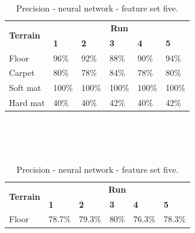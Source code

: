 \documentclass[USenglish]{ifimaster}  %
\begin{document}
\begin{table}[h]
	\begin{subtable}[h]{1\textwidth}
		\centering
		\captionsetup{justification=centering}
		\begin{tabular}{@{}llllll@{}}
			\toprule
			\multirow{2}{*}{\textbf{Terrain}} & \multicolumn{5}{c}{\textbf{Run}} \\ \cmidrule(l){2-6} 
			& \multicolumn{1}{l|}{\textbf{1}} & \multicolumn{1}{l|}{\textbf{2}} & \multicolumn{1}{l|}{\textbf{3}} & \multicolumn{1}{l|}{\textbf{4}} & \textbf{5} \\ \midrule
			\multicolumn{1}{l|}{Floor} & \multicolumn{1}{l|}{96\%} & \multicolumn{1}{l|}{92\%} & \multicolumn{1}{l|}{88\%} & \multicolumn{1}{l|}{90\%} & 94\% \\ \midrule
			\multicolumn{1}{l|}{Carpet} & \multicolumn{1}{l|}{80\%} & \multicolumn{1}{l|}{78\%} & \multicolumn{1}{l|}{84\%} & \multicolumn{1}{l|}{78\%} & 80\% \\ \midrule
			\multicolumn{1}{l|}{Soft mat} & \multicolumn{1}{l|}{100\%} & \multicolumn{1}{l|}{100\%} & \multicolumn{1}{l|}{100\%} & \multicolumn{1}{l|}{100\%} & 100\% \\ \midrule
			\multicolumn{1}{l|}{Hard mat} & \multicolumn{1}{l|}{40\%} & \multicolumn{1}{l|}{40\%} & \multicolumn{1}{l|}{42\%} & \multicolumn{1}{l|}{40\%} & 42\% \\ \bottomrule
		\end{tabular}
		\caption{Precision - neural network - feature set five.}
		\label{tabl:nnset5pre}
	\end{subtable}
\\
\\
\\
	\begin{subtable}[h]{1\textwidth}
		\centering
		\captionsetup{justification=centering}
		\begin{tabular}{@{}llllll@{}}
			\toprule
			\multirow{2}{*}{\textbf{Terrain}} & \multicolumn{5}{c}{\textbf{Run}} \\ \cmidrule(l){2-6} 
			& \multicolumn{1}{l|}{\textbf{1}} & \multicolumn{1}{l|}{\textbf{2}} & \multicolumn{1}{l|}{\textbf{3}} & \multicolumn{1}{l|}{\textbf{4}} & \textbf{5} \\ \midrule
			\multicolumn{1}{l|}{Floor} & \multicolumn{1}{l|}{78.7\%} & \multicolumn{1}{l|}{79.3\%} & \multicolumn{1}{l|}{80\%} & \multicolumn{1}{l|}{76.3\%} & 78.3\% \\ \midrule

\end{tabular}
\end{subtable}
\end{table}
\end{document}
